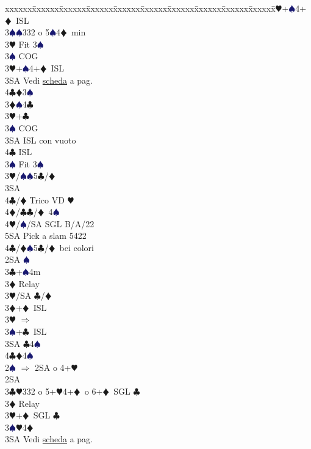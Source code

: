 \documentclass[a4paper,italian]{article}
\newcommand{\BC}{\textcolor{OliveGreen}{$\clubsuit$}}
\newcommand{\BD}{\textcolor{RedOrange}{$\vardiamondsuit$}}
\newcommand{\BH}{\textcolor{Red2}{$\varheartsuit${}}}
\newcommand{\BS}{\textcolor{MidnightBlue}{$\spadesuit${}}}
\newenvironment{bidtable}
{\begin{tabbing}

    xxxxxx\=xxxxxx\=xxxxxx\=xxxxxx\=xxxxxx\=xxxxxx\=xxxxxx\=xxxxxx\=xxxxxx\=xxxxxx\=\kill}
{\end{tabbing} }%
\begin{document}
\begin{multicols}{2}
\begin{bidtable}
        3\BH {}+\BS 4+\BD\ ISL\\
        3\BS {}\BS 332 o 5\BS 4\BD\ min\-\\
        3\BH \> Fit 3\BS \+\\
        3\BS \> COG\\
        3\BH {}+\BS 4+\BD\ ISL\-\\
        3SA\> Vedi \hyperref[Riapertura3SA]{scheda} a pag. \pageref{Riapertura3SA}\\
        4\BC {}\BD 3\BS \-\\
        3\BD {}\BS 4\BC \+\\
        3\BH {}+\BC \+\\
        3\BS \> COG\\
        3SA \> ISL con vuoto\\
        4\BC \> ISL\-\\
        3\BS \> Fit 3\BS \-\\
        3\BH/\BS {}\BS 5\BC /\BD \+\\
        3SA\+\\
        4\BC/\BD \> Trico VD \BH \\
        4\BD/\BC {}\BC /\BD\ 4\BS \\
        4\BH/\BS/SA \>\> SGL B/A/22\\
        5SA \> Pick a slam 5422\-\-\\
        4\BC/\BD {}\BS 5\BC /\BD\ bei colori\-\\
        2SA \BS \+\\
        3\BC {}+\BS 4m\+\\
        3\BD \> Relay\+\\
        3\BH/SA \BC /\BD \-\-\\
        3\BD {}+\BD\ ISL\\
        3\BH \> $\Rightarrow$\\
        3\BS {}+\BC\ ISL\\
        3SA \BC 4\BS \\
        4\BC {}\BD 4\BS \-\-\\
        2\BS \> $\Rightarrow$ 2SA o 4+\BH \+\\
        2SA\+\\
        3\BC {}\BH 332 o 5+\BH 4+\BD\ o 6+\BD\ SGL \BC \+\\
        3\BD \> Relay\+\\
        3\BH {}+\BD\ SGL \BC \\
        3\BS {}\BH 4\BD \+\\
        3SA\> Vedi \hyperref[Riapertura3SA]{scheda} a pag. \pageref{Riapertura3SA}\\

\end{bidtable}
\end{multicols}
\end{document}
